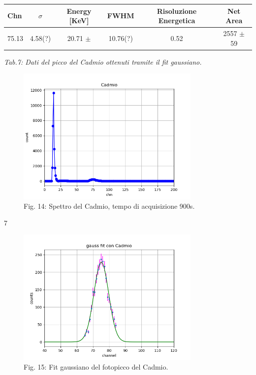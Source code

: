\documentclass[a4paper]{article}
\begin{document}
\begin{center} 
		
		\begin{tabular}{lccccc}
			\hline
			\hline
			\textbf{Chn} & \textbf{$\sigma$}  &     \textbf{Energy} [KeV]  &     \textbf{FWHM}  & \textbf{Risoluzione Energetica}   & \textbf{Net Area} 	 \\
			\hline
			\hline
				       75.13   & 4.58(?)           &	20.71 $\pm$	&		10.76(?) & 0.52		& 2557 $\pm$ 59			\\
				       
			\hline
			\hline
		\end{tabular}
		\linebreak
		\emph{Tab.7: Dati del picco del Cadmio ottenuti tramite il fit gaussiano.} 
	\end{center}
	
\begin{figure}[!h]
\includegraphics[width=0.8\textwidth]{cadmio.png}
        \caption{Fig. 14: Spettro del Cadmio, tempo di acquisizione 900s.}
        \label{fig:14}
\end{figure}7
\begin{figure}[!h]
\includegraphics[width=0.8\textwidth]{fit_gaussiano_con_Cadmio.png}
        \caption{Fig. 15: Fit gaussiano del fotopicco del Cadmio.}
        \label{fig:15}
\end{figure}
\end{document}
